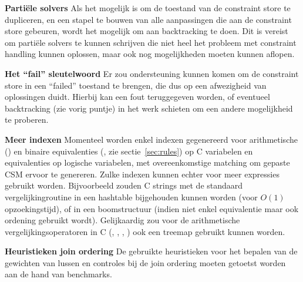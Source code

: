 {\bf Parti\"ele solvers} Als het mogelijk is om de toestand van de constraint store te dupliceren, en een stapel te bouwen van alle aanpassingen die aan de constraint store gebeuren, wordt het mogelijk om aan backtracking te doen. Dit is vereist om parti\"ele solvers te kunnen schrijven die niet heel het probleem met constraint handling kunnen oplossen, maar ook nog mogelijkheden moeten kunnen aflopen.

{\bf Het ``fail'' sleutelwoord} Er zou ondersteuning kunnen komen om de constraint store in een ``failed'' toestand te brengen, die dus op een afwezigheid van oplossingen duidt. Hierbij kan een fout teruggegeven worden, of eventueel backtracking (zie vorig puntje) in het werk schieten om een andere mogelijkheid te proberen.

{\bf Meer indexen} Momenteel worden enkel indexen gegenereerd voor arithmetische (\code{==}) en binaire equivalenties (, zie sectie~\ref{sec:rules}) op C variabelen en equivalenties op logische variabelen, met overeenkomstige matching om gepaste CSM ervoor te genereren. Zulke indexen kunnen echter voor meer expressies gebruikt worden. Bijvoorbeeld zouden C strings met de standaard vergelijkingroutine  in een hashtable bijgehouden kunnen worden (voor $O(1)$ opzoekingstijd), of in een boomstructuur (indien niet enkel equivalentie maar ook ordening gebruikt wordt). Gelijkaardig zou voor de arithmetische vergelijkingsoperatoren in C (\code{>}, \code{<}, \code{>=}, \code{<=}) ook een treemap gebruikt kunnen worden.

{\bf Heuristieken join ordering} De gebruikte heuristieken voor het bepalen van de gewichten van lussen en controles bij de join ordering moeten getoetst worden aan de hand van benchmarks.

